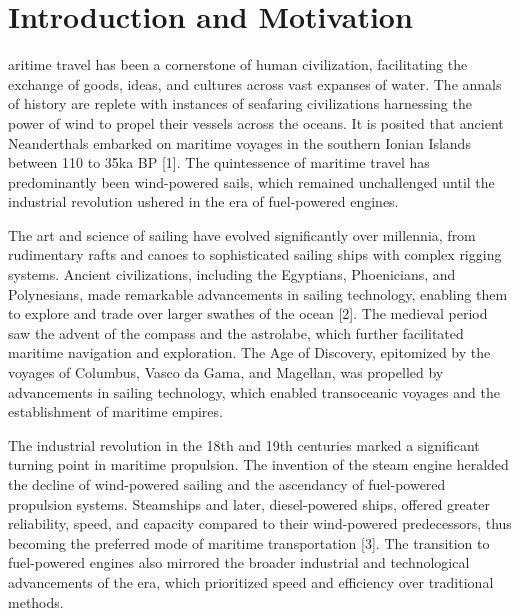 %
%
\let\textcircled=\pgftextcircled
\chapter{Introduction and Motivation}
\label{chap:intro}

aritime travel has been a cornerstone of human civilization, facilitating the exchange of goods, ideas, and cultures across vast expanses of water. The annals of history are replete with instances of seafaring civilizations harnessing the power of wind to propel their vessels across the oceans. It is posited that ancient Neanderthals embarked on maritime voyages in the southern Ionian Islands between 110 to 35ka BP [1]. The quintessence of maritime travel has predominantly been wind-powered sails, which remained unchallenged until the industrial revolution ushered in the era of fuel-powered engines.

The art and science of sailing have evolved significantly over millennia, from rudimentary rafts and canoes to sophisticated sailing ships with complex rigging systems. Ancient civilizations, including the Egyptians, Phoenicians, and Polynesians, made remarkable advancements in sailing technology, enabling them to explore and trade over larger swathes of the ocean [2]. The medieval period saw the advent of the compass and the astrolabe, which further facilitated maritime navigation and exploration. The Age of Discovery, epitomized by the voyages of Columbus, Vasco da Gama, and Magellan, was propelled by advancements in sailing technology, which enabled transoceanic voyages and the establishment of maritime empires.

The industrial revolution in the 18th and 19th centuries marked a significant turning point in maritime propulsion. The invention of the steam engine heralded the decline of wind-powered sailing and the ascendancy of fuel-powered propulsion systems. Steamships and later, diesel-powered ships, offered greater reliability, speed, and capacity compared to their wind-powered predecessors, thus becoming the preferred mode of maritime transportation [3]. The transition to fuel-powered engines also mirrored the broader industrial and technological advancements of the era, which prioritized speed and efficiency over traditional methods.

